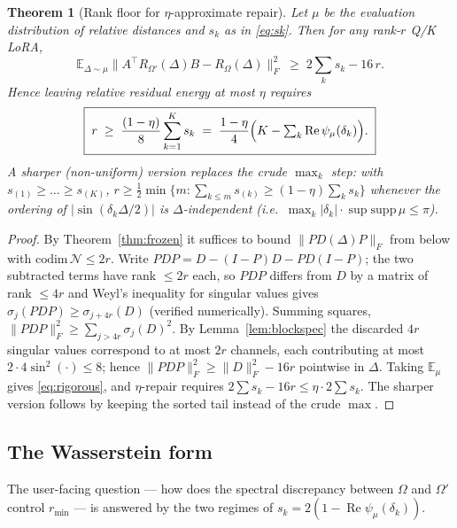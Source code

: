 \documentclass[11pt]{article}
\newtheorem{theorem}{Theorem}[section]
\theoremstyle{definition}
\newcommand{\E}{\mathbb{E}}
\begin{document}
\begin{theorem}[Rank floor for $\eta$-approximate repair]\label{thm:rankfloor}
Let $\mu$ be the evaluation distribution of relative distances and $s_k$ as in \eqref{eq:sk}.
Then for any rank-$r$ Q/K LoRA,
\begin{equation}
\E_{\Delta\sim\mu}\bigl\|A^\top R_{\Omega'}(\Delta)B-R_\Omega(\Delta)\bigr\|_F^2
\;\ge\;2\sum_{k}s_k-16\,r .
\label{eq:rigorous}
\end{equation}
Hence leaving relative residual energy at most $\eta$ requires
\begin{equation}
\boxed{\;r\;\ge\;\frac{(1-\eta)}{8}\sum_{k=1}^K s_k
\;=\;\frac{1-\eta}{4}\Bigl(K-\textstyle\sum_k\operatorname{Re}\psi_\mu(\delta_k)\Bigr).\;}
\label{eq:rmin}
\end{equation}
A sharper (non-uniform) version replaces the crude $\max_k$ step: with $s_{(1)}\ge\dots\ge s_{(K)}$,
$r\ge\tfrac12\min\{m:\sum_{k\le m}s_{(k)}\ge(1-\eta)\sum_ks_k\}$ whenever the ordering of
$|\sin(\delta_k\Delta/2)|$ is $\Delta$-independent (i.e.\ $\max_k|\delta_k|\cdot\sup\mathrm{supp}\,\mu\le\pi$).
\end{theorem}

\begin{proof}
By Theorem~\ref{thm:frozen} it suffices to bound $\|PD(\Delta)P\|_F$ from below with
$\mathrm{codim}\,\mathcal N\le2r$. Write $PDP=D-(I-P)D-PD(I-P)$; the two subtracted terms have rank
$\le 2r$ each, so $PDP$ differs from $D$ by a matrix of rank $\le4r$ and Weyl's inequality for
singular values gives $\sigma_j(PDP)\ge\sigma_{j+4r}(D)$ (verified numerically). Summing squares,
$\|PDP\|_F^2\ge\sum_{j>4r}\sigma_j(D)^2$. By Lemma~\ref{lem:blockspec} the discarded $4r$ singular
values correspond to at most $2r$ channels, each contributing at most
$2\cdot 4\sin^2(\cdot)\le8$; hence
$\|PDP\|_F^2\ge\|D\|_F^2-16r$ pointwise in $\Delta$. Taking $\E_\mu$ gives \eqref{eq:rigorous},
and $\eta$-repair requires $2\sum s_k-16r\le\eta\cdot2\sum s_k$. The sharper version follows by
keeping the sorted tail instead of the crude $\max$.
\end{proof}

\subsection{The Wasserstein form}

The user-facing question --- how does the spectral discrepancy between $\Omega$ and $\Omega'$
control $r_{\min}$ --- is answered by the two regimes of $s_k=2(1-\operatorname{Re}\psi_\mu(\delta_k))$.
\end{document}
